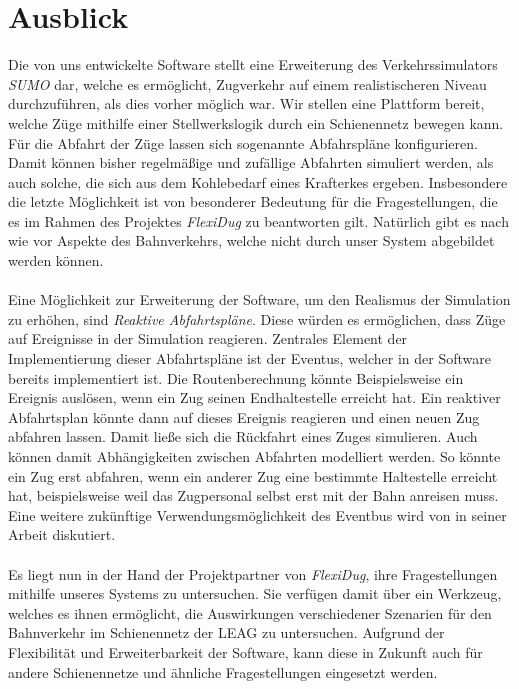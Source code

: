 \section{Ausblick}

Die von uns entwickelte Software stellt eine Erweiterung des Verkehrssimulators \emph{SUMO} dar, welche es ermöglicht, Zugverkehr auf einem realistischeren Niveau durchzuführen, als dies vorher möglich war. Wir stellen eine Plattform bereit, welche Züge mithilfe einer Stellwerkslogik durch ein Schienennetz bewegen kann. Für die Abfahrt der Züge lassen sich sogenannte Abfahrspläne konfigurieren. Damit können bisher regelmäßige und zufällige Abfahrten simuliert werden, als auch solche, die sich aus dem Kohlebedarf eines Krafterkes ergeben. Insbesondere die letzte Möglichkeit ist von besonderer Bedeutung für die Fragestellungen, die es im Rahmen des Projektes \emph{FlexiDug} zu beantworten gilt. Natürlich gibt es nach wie vor Aspekte des Bahnverkehrs, welche nicht durch unser System abgebildet werden können.\\
\\
Eine Möglichkeit zur Erweiterung der Software, um den Realismus der Simulation zu erhöhen, sind \emph{Reaktive Abfahrtspläne}. Diese würden es ermöglichen, dass Züge auf Ereignisse in der Simulation reagieren. Zentrales Element der Implementierung dieser Abfahrtspläne ist der Eventus, welcher in der Software bereits implementiert ist. Die Routenberechnung könnte Beispielsweise ein Ereignis auslösen, wenn ein Zug seinen Endhaltestelle erreicht hat. Ein reaktiver Abfahrtsplan könnte dann auf dieses Ereignis reagieren und einen neuen Zug abfahren lassen. Damit ließe sich die Rückfahrt eines Zuges simulieren. Auch können damit Abhängigkeiten zwischen Abfahrten modelliert werden. So könnte ein Zug erst abfahren, wenn ein anderer Zug eine bestimmte Haltestelle erreicht hat, beispielsweise weil das Zugpersonal selbst erst mit der Bahn anreisen muss. Eine weitere zukünftige Verwendungsmöglichkeit des Eventbus wird von \citeauthor{persitzky_fehlerinjektion_2023} in seiner Arbeit \cite{persitzky_fehlerinjektion_2023} diskutiert.\\
\\
Es liegt nun in der Hand der Projektpartner von \emph{FlexiDug}, ihre Fragestellungen mithilfe unseres Systems zu untersuchen. Sie verfügen damit über ein Werkzeug, welches es ihnen ermöglicht, die Auswirkungen verschiedener Szenarien für den Bahnverkehr im Schienennetz der LEAG zu untersuchen. Aufgrund der Flexibilität und Erweiterbarkeit der Software, kann diese in Zukunft auch für andere Schienennetze und ähnliche Fragestellungen eingesetzt werden.
